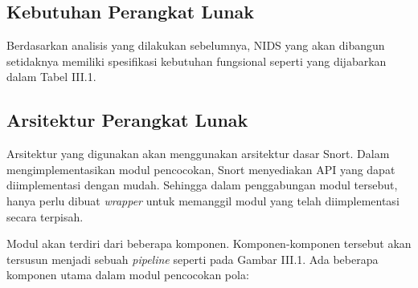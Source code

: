     \subsection{Kebutuhan Perangkat Lunak}

      Berdasarkan analisis yang dilakukan sebelumnya, NIDS yang akan dibangun setidaknya memiliki spesifikasi kebutuhan fungsional seperti yang dijabarkan dalam Tabel III.1.
      
      



    \subsection{Arsitektur Perangkat Lunak}

      Arsitektur yang digunakan akan menggunakan arsitektur dasar Snort. Dalam mengimplementasikan modul pencocokan, Snort menyediakan API yang dapat diimplementasi dengan mudah. Sehingga dalam penggabungan modul tersebut, hanya perlu dibuat \emph{wrapper} untuk memanggil modul yang telah diimplementasi secara terpisah.

      Modul akan terdiri dari beberapa komponen. Komponen-komponen tersebut akan tersusun menjadi sebuah \emph{pipeline} seperti pada Gambar III.1. Ada beberapa komponen utama dalam modul pencocokan pola:

      
      
